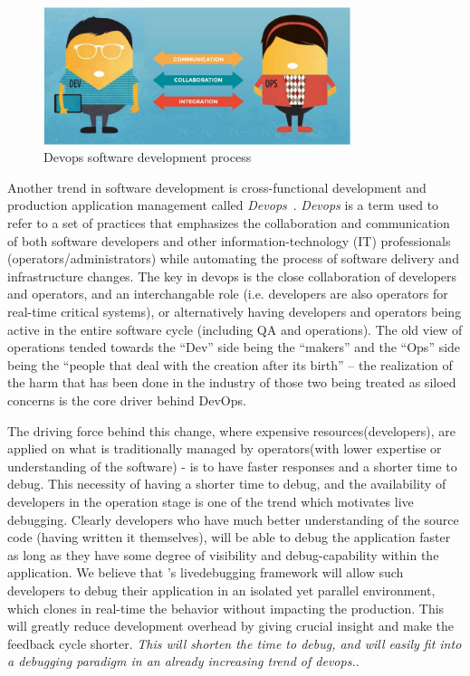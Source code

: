 \begin{figure}[!ht]
	\begin{center}
		\includegraphics[width=0.8\textwidth]{guided/figs/devops.pdf}
		\caption{Devops software development process}
		\label{fig:devops}
	\end{center}
\end{figure}

Another trend in software development is cross-functional development and production application management called \emph{Devops}~\cite{10DevOps}.
\emph{Devops} is a term used to refer to a set of practices that emphasizes the collaboration and communication of both software developers and other information-technology (IT) professionals (operators/administrators) while automating the process of software delivery and infrastructure changes.
The key in devops is the close collaboration of developers and operators, and an interchangable role (i.e. developers are also operators for real-time critical systems), or alternatively having developers and operators being active in the entire software cycle (including QA and operations).
The old view of operations tended towards the “Dev” side being the “makers” and the “Ops” side being the “people that deal with the creation after its birth” – the realization of the harm that has been done in the industry of those two being treated as siloed concerns is the core driver behind DevOps.

The driving force behind this change, where expensive resources(developers), are applied on what is traditionally managed by operators(with lower expertise or understanding of the software) - is to have faster responses and a shorter time to debug.
This necessity of having a shorter time to debug, and the availability of developers in the operation stage is one of the trend which motivates live debugging. 
Clearly developers who have much better understanding of the source code (having written it themselves), will be able to debug the application faster as long as they have some degree of visibility and debug-capability within the application.
We believe that \parikshan's livedebugging framework will allow such developers to debug their application in an isolated yet parallel environment, which clones in real-time the behavior without impacting the production.
This will greatly reduce development overhead by giving crucial insight and make the feedback cycle shorter.
\emph{This will shorten the time to debug, and will easily fit into a debugging paradigm in an already increasing trend of devops.}.


